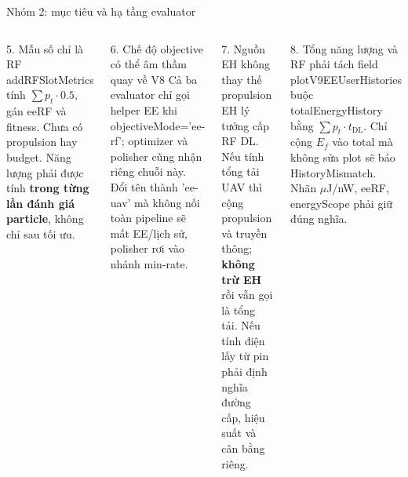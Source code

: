 \documentclass[t,aspectratio=169]{beamer}
\newcommand{\code}[1]{{\small\ttfamily #1}}
\begin{document}
\begin{frame}{Nhóm 2: mục tiêu và hạ tầng evaluator}
  \begin{columns}[T]
  \begin{block}{5. Mẫu số chỉ là RF}\scriptsize
  \code{addRFSlotMetrics} tính $\sum p_t\cdot0.5$, gán \code{eeRF} và fitness. Chưa có propulsion hay budget. Năng lượng phải được tính \textbf{trong từng lần đánh giá particle}, không chỉ sau tối ưu.
  \end{block}
  \begin{block}{6. Chế độ objective có thể âm thầm quay về V8}\scriptsize
  Cả ba evaluator chỉ gọi helper EE khi \code{objectiveMode='ee-rf'}; optimizer và polisher cũng nhận riêng chuỗi này. Đổi tên thành \code{'ee-uav'} mà không nối toàn pipeline sẽ mất EE/lịch sử, polisher rơi vào nhánh min-rate.
  \end{block}
  \begin{block}{7. Nguồn EH không thay thế propulsion}\scriptsize
  EH lý tưởng cấp RF DL. Nếu tính tổng tải UAV thì cộng propulsion và truyền thông; \textbf{không trừ EH} rồi vẫn gọi là tổng tải. Nếu tính điện lấy từ pin phải định nghĩa đường cấp, hiệu suất và cân bằng riêng.
  \end{block}
  \begin{alertblock}{8. Tổng năng lượng và RF phải tách field}\scriptsize
  \code{plotV9EEUserHistories} buộc \code{totalEnergyHistory} bằng $\sum p_t\cdot t_{\mathrm{DL}}$. Chỉ cộng $E_f$ vào total mà không sửa plot sẽ báo \code{HistoryMismatch}. Nhãn $\mu$J/nW, \code{eeRF}, \code{energyScope} phải giữ đúng nghĩa.
  \end{alertblock}
  \end{columns}
\end{frame}
\end{document}
